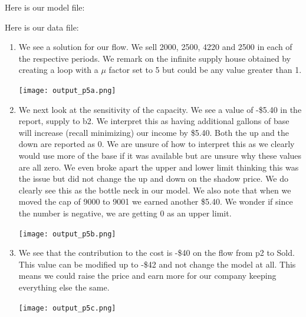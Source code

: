 \documentclass[11pt]{article}
\begin{document}
\begin{enumerate}
Here is our model file:

{\tiny{}}

Here is our data file:

{\tiny {}}

\begin{enumerate}
\item We see a solution for our flow.  We sell 2000, 2500, 4220 and 2500 in each of the respective periods.  We remark on the infinite supply house obtained by creating a loop with a $\mu$ factor set to 5 but could be any value greater than 1.

\texttt{[image: output\_p5a.png]}
\item We next look at the sensitivity of the capacity.  We see a value of -\$5.40 in the report, supply to b2.  We interpret this as having additional gallons of base will increase (recall minimizing) our income by \$5.40.  Both the up and the down are reported as 0.  We are unsure of how to interpret this as we clearly would use more of the base if it was available but are unsure why these values are all zero.  We even broke apart the upper and lower limit thinking this was the issue but did not change the up and down on the shadow price.  We do clearly see this as the bottle neck in our model.  We also note that when we moved the cap of 9000 to 9001 we earned another \$5.40.  We wonder if since the number is negative, we are getting 0 as an upper limit.

\texttt{[image: output\_p5b.png]}
\item We see that the contribution to the cost is -\$40 on the flow from p2 to Sold.  This value can be modified up to -\$42 and not change the model at all.  This means we could raise the price and earn more for our company keeping everything else the same. 


\texttt{[image: output\_p5c.png]}
\end{enumerate}

\end{enumerate}
\end{document}
